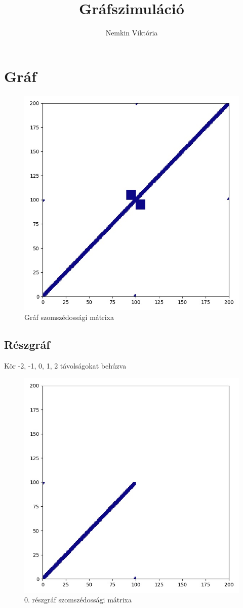 \documentclass[14pt,a4paper]{article}
\title{Gráfszimuláció}
\author{Nemkin Viktória}
\date{}
\begin{document}
\maketitle
\section{Gráf}
\begin{figure}[H]
\centering
\includegraphics[width = 0.7\columnwidth]{graph.jpg}
\caption{Gráf szomszédossági mátrixa}
\end{figure}
\subsection{Részgráf}
Kör -2, -1, 0, 1, 2 távolságokat behúzva
\begin{figure}[H]
\centering
\includegraphics[width = 0.7\columnwidth]{subgraph_00.jpg}
\caption{0. részgráf szomszédossági mátrixa}
\end{figure}
\end{document}
